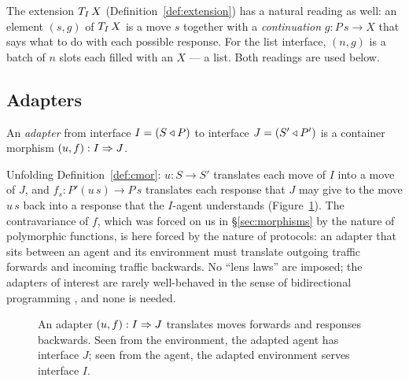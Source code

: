 \documentclass{fundam}
\begin{document}
The extension $T_{I}\,X$ (Definition~\ref{def:extension}) has a natural reading as well:
an element $(s, g)$ of $T_{I}\,X$ is a move $s$ together with a \emph{continuation}
$g : P\,s \to X$ that says what to do with each possible response.  For the list
interface, $(n, g)$ is a batch of $n$ slots each filled with an $X$ --- a list.  Both
readings are used below.

\subsection{Adapters}

\begin{definition}[Adapter]\label{def:adapter}
  An \emph{adapter} from interface $I = (S \triangleleft P)$ to interface $J = (S' \triangleleft P')$ is a
  container morphism $(u, f) : I \Rightarrow J$.
\end{definition}

Unfolding Definition~\ref{def:cmor}: $u : S \to S'$ translates each move of $I$ into a
move of $J$, and $f_s : P'(u\,s) \to P\,s$ translates each response that $J$ may give
to the move $u\,s$ back into a response that the $I$-agent understands
(Figure~\ref{fig:lens}).  The contravariance of $f$, which was forced on us in
\S\ref{sec:morphisms} by the nature of polymorphic functions, is here forced by the
nature of protocols: an adapter that sits between an agent and its environment must
translate outgoing traffic forwards and incoming traffic backwards.  No ``lens laws'' are
imposed; the adapters of interest are rarely well-behaved in the sense of bidirectional
programming \cite{FosterEtAl07}, and none is needed.

\begin{figure}[t]
  \centering
  \caption{An adapter $(u,f) : I \Rightarrow J$ translates moves forwards and responses
    backwards.  Seen from the environment, the adapted agent has interface $J$; seen from
    the agent, the adapted environment serves interface $I$.}
  \label{fig:lens}
\end{figure}
\end{document}
